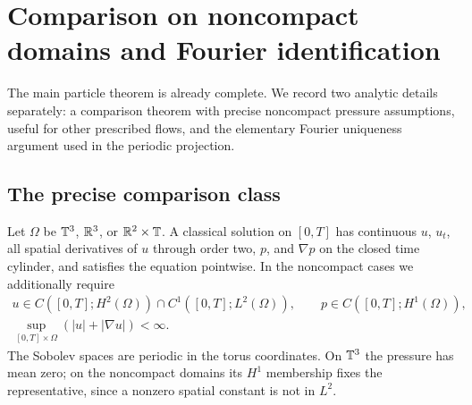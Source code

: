 \appendix
\section{Comparison on noncompact domains and Fourier identification}
The main particle theorem is already complete. We record two analytic
details separately: a comparison theorem with precise noncompact
pressure assumptions, useful for other prescribed flows, and the
elementary Fourier uniqueness argument used in the periodic projection.

\subsection{The precise comparison class}\label{app:comparison}
Let $\Omega$ be $\mathbb T^3$, $\mathbb R^3$, or
$\mathbb R^2\times\mathbb T$. A classical solution on $[0,T]$ has continuous
$u$, $u_t$, all spatial derivatives of $u$ through order two, $p$, and
$\nabla p$ on the closed time cylinder, and satisfies the equation
pointwise. In the noncompact cases we additionally require
\begin{equation}\label{eq:energy-class}
 \begin{gathered}
 u\in C([0,T];H^2(\Omega))\cap C^1([0,T];L^2(\Omega)),
 \qquad p\in C([0,T];H^1(\Omega)),\\
 \sup_{[0,T]\times\Omega}(|u|+|\nabla u|)<\infty.
 \end{gathered}
\end{equation}
The Sobolev spaces are periodic in the torus coordinates. On $\mathbb T^3$
the pressure has mean zero; on the noncompact domains its $H^1$
membership fixes the representative, since a nonzero spatial constant
is not in $L^2$.

